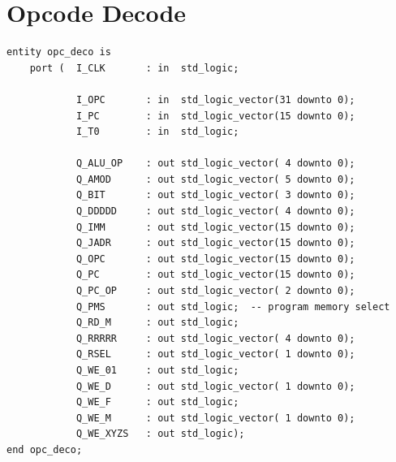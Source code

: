 \documentclass[12pt,a4paper]{report}
\begin{document}
\section{Opcode Decode}
\begin{lstlisting}
entity opc_deco is
    port (  I_CLK       : in  std_logic;

            I_OPC       : in  std_logic_vector(31 downto 0);
            I_PC        : in  std_logic_vector(15 downto 0);
            I_T0        : in  std_logic;

            Q_ALU_OP    : out std_logic_vector( 4 downto 0);
            Q_AMOD      : out std_logic_vector( 5 downto 0);
            Q_BIT       : out std_logic_vector( 3 downto 0);
            Q_DDDDD     : out std_logic_vector( 4 downto 0);
            Q_IMM       : out std_logic_vector(15 downto 0);
            Q_JADR      : out std_logic_vector(15 downto 0);
            Q_OPC       : out std_logic_vector(15 downto 0);
            Q_PC        : out std_logic_vector(15 downto 0);
            Q_PC_OP     : out std_logic_vector( 2 downto 0);
            Q_PMS       : out std_logic;  -- program memory select
            Q_RD_M      : out std_logic;
            Q_RRRRR     : out std_logic_vector( 4 downto 0);
            Q_RSEL      : out std_logic_vector( 1 downto 0);
            Q_WE_01     : out std_logic;
            Q_WE_D      : out std_logic_vector( 1 downto 0);
            Q_WE_F      : out std_logic;
            Q_WE_M      : out std_logic_vector( 1 downto 0);
            Q_WE_XYZS   : out std_logic);
end opc_deco;
\end{lstlisting}
\end{document}
